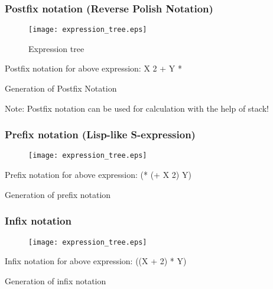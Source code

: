 \documentclass[hyperref={colorlinks=true},xcolor=table]{beamer}
\begin{document}
\scriptsize
\begin{frame}
  \frametitle{Postfix notation (Reverse Polish Notation)}
  \begin{figure}
    \texttt{[image: expression\_tree.eps]}
    \caption{Expression tree}
  \end{figure}
  Postfix notation for above expression: X 2 + Y *
  \begin{algorithm}[H]
    \caption{Generation of Postfix Notation}
  \end{algorithm}
  Note: Postfix notation can be used for calculation with the help of stack!
\end{frame}
\normalsize

\scriptsize
\begin{frame}
  \frametitle{Prefix notation (Lisp-like S-expression)}
  \begin{figure}
    \texttt{[image: expression\_tree.eps]}
  \end{figure}
  Prefix notation for above expression: (* (+ X 2) Y)
  \begin{algorithm}[H]
    \caption{Generation of prefix notation}
  \end{algorithm}
\end{frame}
\normalsize

\scriptsize
\begin{frame}
  \frametitle{Infix notation}
  \begin{figure}
    \texttt{[image: expression\_tree.eps]}
  \end{figure}
  Infix notation for above expression: ((X + 2) * Y)
  \begin{algorithm}[H]
    \caption{Generation of infix notation}
  \end{algorithm}
\end{frame}
\normalsize
\end{document}
